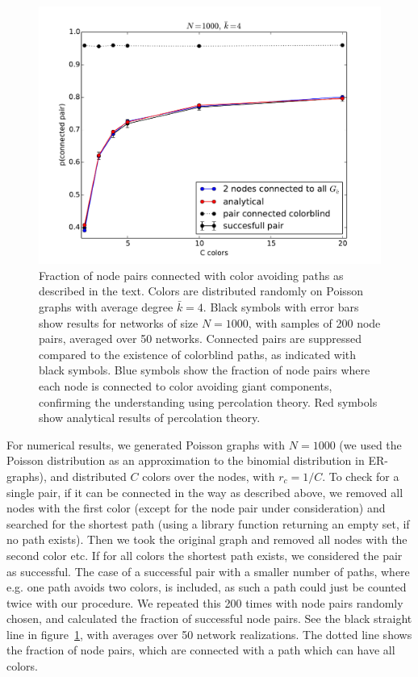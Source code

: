 \documentclass[aps, pre, onecolumn, a4paper, floatfix]{revtex4}
\begin{document}
\begin{figure}[htb]
\begin{center}
	\includegraphics[width=0.7\columnwidth]{finder_C.pdf}
	\caption{Fraction of node pairs connected with color avoiding paths as described 
	in the text. Colors are distributed randomly on Poisson graphs with average degree 
	${\bar k}=4$. Black symbols with error bars show results for networks of size 
	$N=1000$, with samples of 200 node pairs, averaged over 50 networks. Connected pairs 
	are suppressed compared to the existence of colorblind paths, as indicated with 
	black symbols. 
	Blue symbols show the fraction of node pairs where each node is connected 
	to color avoiding giant components, confirming 
	the understanding using percolation theory. Red symbols show analytical results 
	of percolation theory.}
	\label{fig:model}
\end{center}
\end{figure}
%
For numerical results, we generated Poisson graphs with $N=1000$ (we used the 
Poisson distribution as an approximation to the binomial distribution in 
ER-graphs), and distributed $C$ colors over the nodes, with $r_c=1/C$. 
To check for a single pair, if it can be connected in 
the way as described above, we removed all nodes with the first color (except for 
the node pair under consideration) and 
searched for the shortest path (using a library function returning an empty set, 
if no path exists). Then we took the original graph and removed all nodes with the 
second color etc. If for all colors the shortest path exists, we considered the 
pair as successful. The case of a successful pair with a smaller number of 
paths, where e.g. one path avoids two colors, is included, as such a path could 
just be counted twice with our procedure. We repeated this 200 times with node pairs 
randomly chosen, and calculated the fraction of successful node pairs. See the black 
straight line in figure~\ref{fig:model}, with averages over 50 network realizations. The dotted 
line shows the fraction of node pairs, which are connected with a path which can 
have all colors. 
\end{document}
